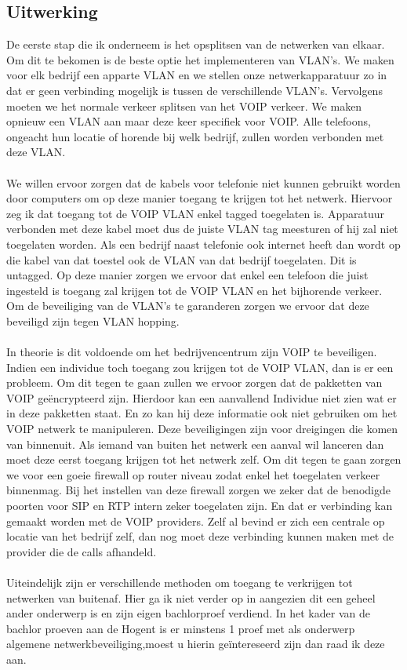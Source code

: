 \documentclass[pdftex,a4paper,12pt,twoside]{report}
\begin{document}
\subsection{Uitwerking}
De eerste stap die ik onderneem is het opsplitsen van de netwerken van elkaar. Om dit te bekomen is de beste optie het implementeren van VLAN's. We maken voor elk bedrijf een apparte VLAN en we stellen onze netwerkapparatuur zo in dat er geen verbinding mogelijk is tussen de verschillende VLAN's. Vervolgens moeten we het normale verkeer splitsen van het VOIP verkeer.
We maken opnieuw een VLAN aan maar deze keer specifiek voor VOIP. Alle telefoons, ongeacht hun locatie of horende bij welk bedrijf, zullen worden verbonden met deze VLAN.
\\ \\
We willen ervoor zorgen dat de kabels voor telefonie niet kunnen gebruikt worden door computers om op deze manier toegang te krijgen tot het netwerk. Hiervoor zeg ik dat toegang tot de VOIP VLAN enkel tagged toegelaten is. Apparatuur verbonden met deze kabel moet dus de juiste VLAN tag meesturen of hij zal niet toegelaten worden. Als een bedrijf naast telefonie ook internet heeft dan wordt op die kabel van dat toestel ook de VLAN van dat bedrijf toegelaten. Dit is untagged. Op deze manier zorgen we ervoor dat enkel een telefoon die juist ingesteld is toegang zal krijgen tot de VOIP VLAN en het bijhorende verkeer.  Om de beveiliging van de VLAN's te garanderen zorgen we ervoor dat deze beveiligd zijn tegen VLAN hopping. 
\\ \\
In theorie is dit voldoende om het bedrijvencentrum zijn VOIP te beveiligen. Indien een individue toch toegang zou krijgen tot de VOIP VLAN, dan is er een probleem. Om dit tegen te gaan zullen we ervoor zorgen dat de pakketten van VOIP geëncrypteerd zijn. Hierdoor kan een aanvallend Individue niet zien wat er in deze pakketten staat. En zo kan hij deze informatie ook niet gebruiken om het VOIP netwerk te manipuleren.
\newpage
Deze beveiligingen zijn voor dreigingen die komen van binnenuit. Als iemand van buiten het netwerk een aanval wil lanceren dan moet deze eerst toegang krijgen tot het netwerk zelf. Om dit tegen te gaan zorgen we voor een goeie firewall op router niveau zodat enkel het toegelaten verkeer binnenmag. Bij het instellen van deze firewall zorgen we zeker dat de benodigde poorten voor SIP en RTP intern zeker toegelaten zijn. En dat er verbinding kan gemaakt worden met de VOIP providers. Zelf al bevind er zich een centrale op locatie van het bedrijf zelf, dan nog moet deze verbinding kunnen maken met de provider die de calls afhandeld.
 \\ \\
Uiteindelijk zijn er verschillende methoden om toegang te verkrijgen tot netwerken van buitenaf. Hier ga ik niet verder op in aangezien dit een geheel ander onderwerp is en zijn eigen bachlorproef verdiend. In het kader van de bachlor proeven aan de Hogent is er minstens 1 proef met als onderwerp algemene netwerkbeveiliging,moest u hierin geïntereseerd zijn dan raad ik deze aan.
\end{document}
